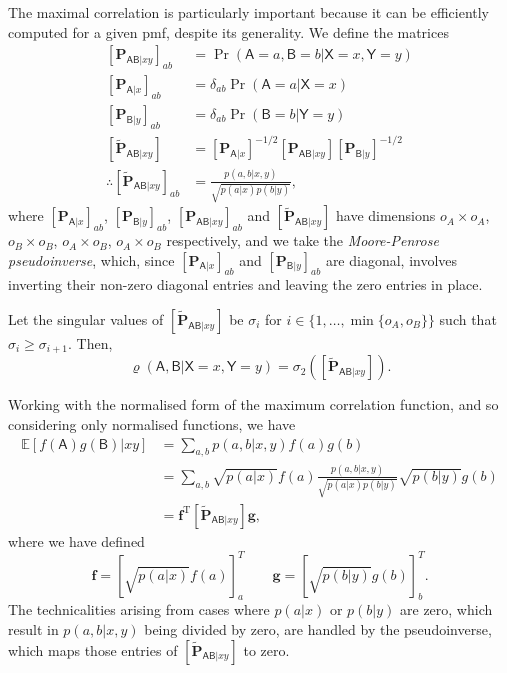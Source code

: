 \documentclass[10pt, a4paper]{article}
\numberwithin{equation}{section} %
\theoremstyle{definition}
\theoremstyle{plain}
\newcommand{\dintv}[2]{\mathopen\{#1,\ldots,#2\mathclose\}}
\newcommand{\?}{\mathrel{?}} %
\newcommand{\tpose}{\mathrm{T}}
\newcommand{\cvec}[1]{\boldsymbol{\mathbf{#1}}}    %
\newcommand{\rvec}[1]{\boldsymbol{\mathbf{#1}}^\tpose} %
\newcommand{\matr}[2][]{\left[\mathbf{#2}#1\right]} %
\newcommand{\E}{\mathbb{E}} %
\newcommand{\crv}[1]{\mathsf{#1}}
\begin{document}
                  The maximal correlation is particularly important because it can be efficiently computed for a given pmf, despite its generality. We define the matrices
                  \begin{align}
                    \matr[_{\crv{AB}|xy}]{P}_{ab} &= \Pr(\crv{A} = a, \crv{B} = b|\crv{X} = x, \crv{Y} = y) \\
                    \matr[_{\crv{A}|x}]{P}_{ab} &= \delta_{ab} \Pr(\crv{A} = a|\crv{X} = x) \\
                    \matr[_{\crv{B}|y}]{P}_{ab} &= \delta_{ab} \Pr(\crv{B} = b|\crv{Y} = y) \\
                    \matr[_{\crv{AB}|xy}]{\tilde{P}} &= \matr[_{\crv{A}|x}]{P}^{-1/2} \matr[_{\crv{AB}|xy}]{P} \matr[_{\crv{B}|y}]{P}^{-1/2} \\
                    \therefore \matr[_{\crv{AB}|xy}]{\tilde{P}}_{ab} &= \frac{p(a,b|x,y)}{\sqrt{p(a|x)p(b|y)}},
                  \end{align}
                  where \(\matr[_{\crv{A}|x}]{P}_{ab}\), \(\matr[_{\crv{B}|y}]{P}_{ab}\), \(\matr[_{\crv{AB}|xy}]{P}_{ab}\) and \(\matr[_{\crv{AB}|xy}]{\tilde{P}}\) have dimensions \(o_A \times o_A\), \(o_B \times o_B\), \(o_A \times o_B\), \(o_A \times o_B\) respectively, and we take the \emph{Moore-Penrose pseudoinverse}, which, since \(\matr[_{\crv{A}|x}]{P}_{ab}\) and \(\matr[_{\crv{B}|y}]{P}_{ab}\) are diagonal, involves inverting their non-zero diagonal entries and leaving the zero entries in place.

                  Let the singular values of \(\matr[_{\crv{AB}|xy}]{\tilde{P}}\) be \(\sigma_i\) for \(i \in \dintv{1}{\min\{o_A, o_B\}}\) such that \(\sigma_{i} \geq \sigma_{i+1}\). Then,
                  \begin{equation}
                    \varrho(\crv{A},\crv{B}|\crv{X}=x,\crv{Y}=y) = \sigma_2\left( \matr[_{\crv{AB}|xy}]{\tilde{P}} \right).
                  \end{equation}

                  Working with the normalised form of the maximum correlation function, and so considering only normalised functions, we have
                  \begin{align}
                    \E[f(\crv{A})g(\crv{B})|xy] &= \sum_{a,b} p(a,b|x,y) f(a)g(b) \\
                                                &= \sum_{a,b} \sqrt{p(a|x)} f(a) \frac{p(a,b|x,y)}{\sqrt{p(a|x)p(b|y)}} \sqrt{p(b|y)} g(b) \\
                                                &= \rvec{f} \matr[_{\crv{AB}|xy}]{\tilde{P}} \cvec{g},
                  \end{align}
                  where we have defined
                  \begin{equation}
                    \cvec{f} = {[\sqrt{p(a|x)} f(a)]}^T_a \qquad \cvec{g} = {[\sqrt{p(b|y)} g(b)]}^T_b.
                  \end{equation}
                  The technicalities arising from cases where \(p(a|x)\) or \(p(b|y)\) are zero, which result in \(p(a,b|x,y)\) being divided by zero, are handled by the pseudoinverse, which maps those entries of \(\matr[_{\crv{AB}|xy}]{\tilde{P}}\) to zero.
\end{document}
